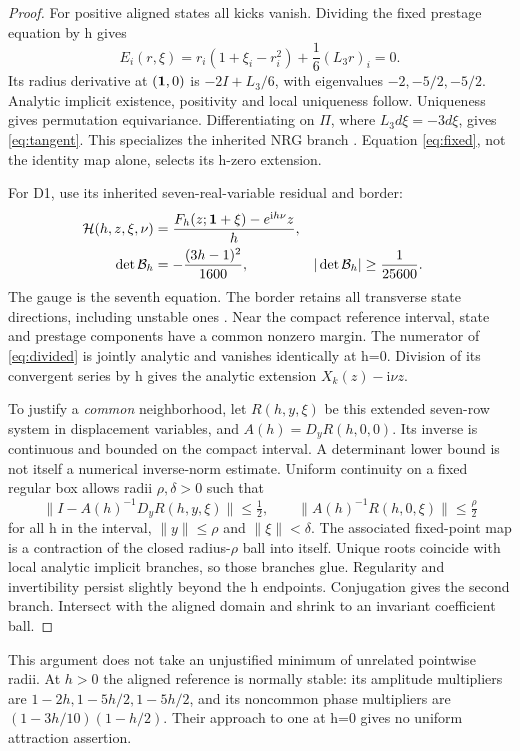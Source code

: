 \documentclass[11pt,a4paper]{article}
\numberwithin{equation}{section}
\theoremstyle{remark}\newtheorem{remark}[theorem]{Remark}
\newcommand{\iu}{\mathrm i}\newcommand{\Id}{I}\newcommand{\Argz}{\operatorname{Arg}_0}
\begin{document}
\begin{proof}
For positive aligned states all kicks vanish. Dividing the fixed prestage equation by h gives
\begin{equation}
E_i(r,\xi)=r_i(1+\xi_i-r_i^2)+\frac16(L_3r)_i=0.
\label{eq:fixed}
\end{equation}
Its radius derivative at $(\mathbf1,0)$ is $-2I+L_3/6$, with eigenvalues $-2,-5/2,-5/2$. Analytic implicit existence, positivity and local uniqueness follow. Uniqueness gives permutation equivariance. Differentiating on $\Pi$, where $L_3d\xi=-3d\xi$, gives \eqref{eq:tangent}. This specializes the inherited NRG branch \cite[\texttt{thm:branch}, \texttt{eq:screen}]{nrg}. Equation \eqref{eq:fixed}, not the identity map alone, selects its h-zero extension.

For D1, use its inherited seven-real-variable residual and border:
\begin{align}
\mathcal H(h,z,\xi,\nu)&=\frac{F_h(z;\one+\xi)-e^{\iu h\nu}z}{h},\label{eq:divided}\\
\det\mathcal B_h&=-\frac{(3h-1)^2}{1600},
&|\det\mathcal B_h|&\ge\frac1{25600}.\label{eq:border}
\end{align}
The gauge is the seventh equation. The border retains all transverse state directions, including unstable ones \cite[D23--D27]{drift}. Near the compact reference interval, state and prestage components have a common nonzero margin. The numerator of \eqref{eq:divided} is jointly analytic and vanishes identically at h=0. Division of its convergent series by h gives the analytic extension $X_k(z)-\iu\nu z$.

To justify a \emph{common} neighborhood, let $R(h,y,\xi)$ be this extended seven-row system in displacement variables, and $A(h)=D_yR(h,0,0)$. Its inverse is continuous and bounded on the compact interval. A determinant lower bound is not itself a numerical inverse-norm estimate. Uniform continuity on a fixed regular box allows radii $\rho,\delta>0$ such that
\begin{equation}
\|I-A(h)^{-1}D_yR(h,y,\xi)\|\le\tfrac12,
\qquad \|A(h)^{-1}R(h,0,\xi)\|\le\tfrac\rho2
\label{eq:uniform}
\end{equation}
for all h in the interval, $\|y\|\le\rho$ and $\|\xi\|<\delta$. The associated fixed-point map is a contraction of the closed radius-$\rho$ ball into itself. Unique roots coincide with local analytic implicit branches, so those branches glue. Regularity and invertibility persist slightly beyond the h endpoints. Conjugation gives the second branch. Intersect with the aligned domain and shrink to an invariant coefficient ball.
\end{proof}
This argument does not take an unjustified minimum of unrelated pointwise radii. At $h>0$ the aligned reference is normally stable: its amplitude multipliers are $1-2h,1-5h/2,1-5h/2$, and its noncommon phase multipliers are $(1-3h/10)(1-h/2)$. Their approach to one at h=0 gives no uniform attraction assertion.
\end{document}
